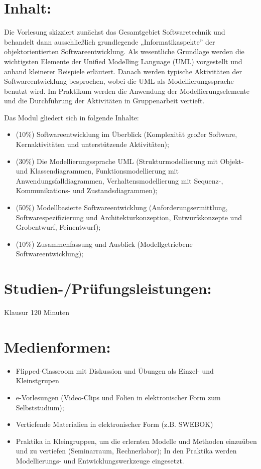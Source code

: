 \section*{Inhalt:}\label{inhalt-22}

Die Vorlesung skizziert zunächst das Gesamtgebiet Softwaretechnik und
behandelt dann ausschließlich grundlegende „Informatikaspekte'' der
objektorientierten Softwareentwicklung. Als wesentliche Grundlage werden
die wichtigsten Elemente der Unified Modelling Language (UML)
vorgestellt und anhand kleinerer Beispiele erläutert. Danach werden
typische Aktivitäten der Softwareentwicklung besprochen, wobei die UML
als Modellierungssprache benutzt wird. Im Praktikum werden die Anwendung
der Modellierungselemente und die Durchführung der Aktivitäten in
Gruppenarbeit vertieft.

Das Modul gliedert sich in folgende Inhalte:

\begin{itemize}
\tightlist
\item
  (10\%) Softwareentwicklung im Überblick (Komplexität großer Software,
  Kernaktivitäten und unterstützende Aktivitäten);
\item
  (30\%) Die Modellierungssprache UML (Strukturmodellierung mit Objekt-
  und Klassendiagrammen, Funktionsmodellierung mit
  Anwendungsfalldiagrammen, Verhaltensmodellierung mit Sequenz-,
  Kommunikations- und Zustandsdiagrammen);
\item
  (50\%) Modellbasierte Softwareentwicklung (Anforderungsermittlung,
  Softwarespezifizierung und Architekturkonzeption, Entwurfskonzepte und
  Grobentwurf, Feinentwurf);
\item
  (10\%) Zusammenfassung und Ausblick (Modellgetriebene
  Softwareentwicklung);
\end{itemize}

\section*{Studien-/Prüfungsleistungen:}\label{studien-pruxfcfungsleistungen-20}

Klausur 120 Minuten

\section*{Medienformen:}\label{medienformen-13}

\begin{itemize}
\tightlist
\item
  Flipped-Classroom mit Diskussion und Übungen als Einzel- und
  Kleinstgrupen
\item
  e-Vorlesungen (Video-Clips und Folien in elektronischer Form zum
  Selbststudium);
\item
  Vertiefende Materialien in elektronischer Form (z.B. SWEBOK)
\item
  Praktika in Kleingruppen, um die erlernten Modelle und Methoden
  einzuüben und zu vertiefen (Seminarraum, Rechnerlabor); In den
  Praktika werden Modellierungs- und Entwicklungswerkzeuge eingesetzt.
\end{itemize}

